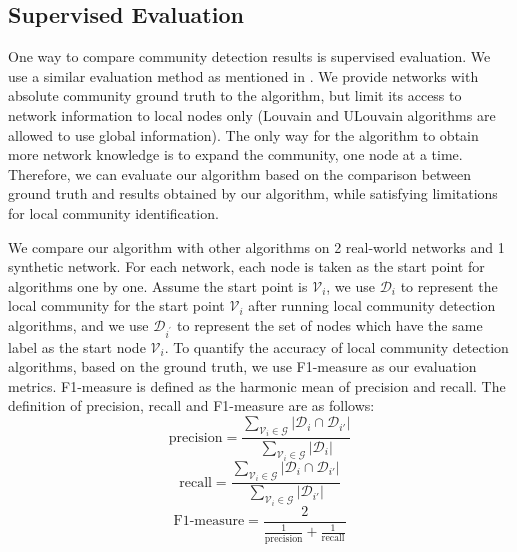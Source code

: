 \documentclass[\main/thesis.tex]{subfiles}
\begin{document}
\subsection*{Supervised Evaluation}
One way to compare community detection results is supervised evaluation. We use a similar evaluation method as mentioned in \cite{chen2009local}. We provide networks with absolute community ground truth to the algorithm, but limit its access to network information to local nodes only (Louvain and ULouvain algorithms are allowed to use global information). The only way for the algorithm to obtain more network knowledge is to expand the community, one node at a time. Therefore, we can evaluate our algorithm based on the comparison between ground truth and results obtained by our algorithm, while satisfying limitations for local community identification.

We compare our algorithm with other algorithms on 2 real-world networks and 1 synthetic network. For each network, each node is taken as the start point for algorithms one by one. Assume the start point is $\mathcal{V}_i$, we use $\mathcal{D}_{i}$ to represent the local community for the start point $\mathcal{V}_i$ after running local community detection algorithms, and we use $\mathcal{D}_{i^\prime}$ to represent the set of nodes which have the same label as the start node $\mathcal{V}_i$. To quantify the accuracy of local community detection algorithms, based on the ground truth, we use F1-measure as our evaluation metrics. F1-measure is defined as the harmonic mean of precision and recall. The definition of precision, recall and F1-measure are as follows:
\begin{equation}
\text{precision} = \frac{\sum_{\mathcal{V}_i\in \mathcal{G}}|\mathcal{D}_{i} \cap \mathcal{D}_{i\prime}|}{\sum_{\mathcal{V}_i\in \mathcal{G}}|\mathcal{D}_{i}|}
\end{equation}
\begin{equation}
\text{recall} = \frac{\sum_{\mathcal{V}_i\in \mathcal{G}}|\mathcal{D}_{i} \cap \mathcal{D}_{i\prime}|}{\sum_{\mathcal{V}_i\in \mathcal{G}}|\mathcal{D}_{i\prime}|}
\end{equation}
\begin{equation}
\text{F1-measure} = \frac{2}{\frac{1}{\text{precision}}+\frac{1}{\text{recall}}}
\end{equation}
\end{document}
